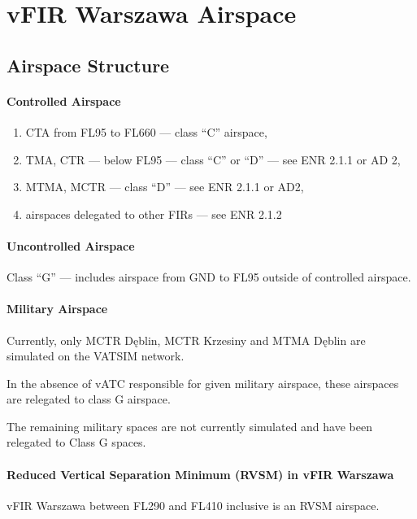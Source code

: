 \chapter{vFIR Warszawa Airspace}%
\label{ch:airspace}
\section{Airspace Structure}%
\label{sect:airspace:structure}

\subsubsection{Controlled Airspace}
\begin{enumerate}[label={\alph*)}]
    \item CTA from FL95 to FL660 --- class ``C'' airspace,
    \item TMA, CTR --- below FL95 --- class ``C'' or ``D'' --- see ENR 2.1.1 or AD 2,
    \item MTMA, MCTR --- class ``D'' --- see ENR 2.1.1 or AD2,
    \item airspaces delegated to other FIRs --- see ENR 2.1.2
\end{enumerate}

\subsubsection{Uncontrolled Airspace}
Class ``G'' --- includes airspace from GND to FL95 outside of controlled airspace.

\subsubsection{Military Airspace}

Currently, only MCTR Dęblin, MCTR Krzesiny and MTMA Dęblin are simulated on the VATSIM network.

In the absence of vATC responsible for given military airspace, these airspaces are relegated to class G airspace.

The remaining military spaces are not currently simulated and have been relegated to Class G spaces.

\subsubsection{Reduced Vertical Separation Minimum (RVSM) in vFIR Warszawa}
vFIR Warszawa between FL290 and FL410 inclusive is an RVSM airspace.

